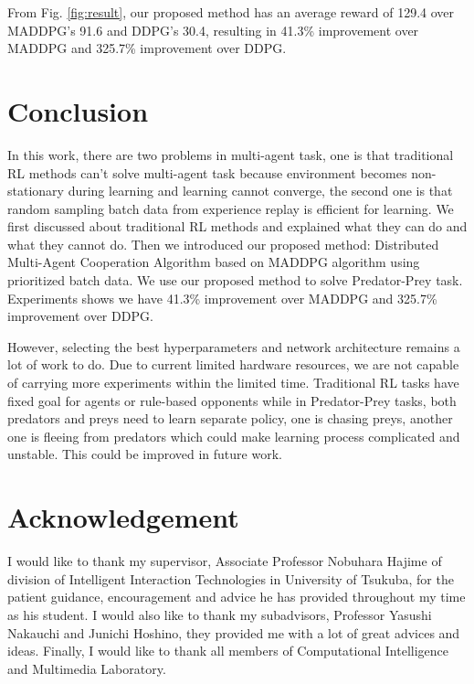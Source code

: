 \documentclass[11pt,twocolumn]{jarticle} %
\begin{document}
From Fig. \ref{fig:result}, our proposed method has an average reward of 129.4 over MADDPG's 91.6 and DDPG's 30.4, resulting in 41.3\% improvement over MADDPG and 325.7\% improvement over DDPG.

\section{Conclusion}
In this work, there are two problems in multi-agent task, one is that traditional RL methods can't solve multi-agent task because environment becomes non-stationary during learning and learning cannot converge, the second one is that random sampling batch data from experience replay is efficient for learning. We first discussed about traditional RL methods and explained what they can do and what they cannot do. Then we introduced our proposed method: Distributed Multi-Agent Cooperation Algorithm based on MADDPG algorithm using prioritized batch data. We use our proposed method to solve Predator-Prey task. Experiments shows we have 41.3\% improvement over MADDPG and 325.7\% improvement over DDPG. \par
However, selecting the best hyperparameters and network architecture remains a lot of work to do. Due to current limited hardware resources, we are not capable of carrying more experiments within the limited time. Traditional RL tasks have fixed goal for agents or rule-based opponents while in Predator-Prey tasks, both predators and preys need to learn separate policy, one is chasing preys, another one is fleeing from predators which could make learning process complicated and unstable. This could be improved in future work.


\section*{Acknowledgement}
I would like to thank my supervisor, Associate Professor Nobuhara Hajime of division of Intelligent Interaction Technologies in University of Tsukuba, for the patient guidance, encouragement and advice he has provided throughout my time as his student. I would also like to thank my subadvisors, Professor Yasushi Nakauchi and Junichi Hoshino, they provided me with a lot of great advices and ideas. Finally, I would like to thank all members of Computational Intelligence and Multimedia Laboratory.
\end{document}
